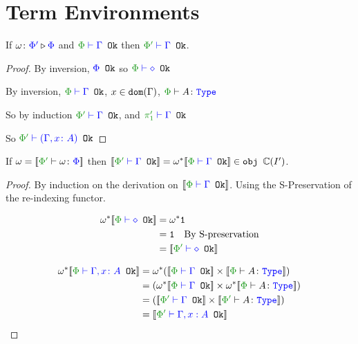 \documentclass{report}
\begin{document}
\section{Term Environments}
 
\begin{theorem}
If $\omega \colon {\color{blue}\Phi'} \triangleright {\color {blue} \Phi}$ and $\wellformedok{\P}{\G}$  then $\wellformedok{\P'}{\G}$.
\end{theorem}

\begin{framed}
     \begin{proof}
            \case{\envnil}
            By inversion,  ${\color{blue} \Phi} \texttt{ Ok}$ so $\wellformedok{\P}{\nil}$
            \case{\envextend}
        
            By inversion,  $\wellformedok{\P}{\G}$, $x\in\texttt{dom}(\Gamma)$, $\wellformedt{\P}{A}$
        
            So by induction $\wellformedok{\P'}{\G}$, and $\wellformedok{\p'}{\G}$
        
            So $\wellformedok{\P'}{(\gax)}$
     \end{proof}
        
    
\end{framed}
\begin{theorem}
      
    If $\w = \deno{\typerelation{\P'}{\w}{\P}}$ then $\deno{\wellformedok{\P'}{\G}} = \w\star\deno{\wellformedok{\P}{\G}}\in\obj\C(I')$.
\end{theorem}

\begin{framed}
    \begin{proof}
        By induction on the derivation on $\deno{\wellformedok{\P}{\G}}$. Using the S-Preservation of the re-indexing functor.
        
        \case{\envnil}
        \begin{align*}
            \w\star\deno{\wellformedok{\P}{\nil}} &=\w\star\1\\
            & = \1\qt{By S-preservation}\\
            &= \deno{\wellformedok{\P'}{\nil}}\\
        \end{align*}
        
        \case{\envextend}
        \begin{align*}
           \w\star\deno{\wellformedok{\P}{\gax}} &= \w\star(\deno{\wellformedok{\P}{\G}} \times \deno{\typerelation{\P}{A}{\type}}) \\
           & = (\w\star\deno{\wellformedok{\P}{\G}} \times \w\star\deno{\typerelation{\P}{A}{\type}})\\
            & = (\deno{\wellformedok{\P'}{\G}} \times \deno{\typerelation{\P'}{A}{\type}})\\
            & = \deno{\wellformedok{\P'}{\G, x: A}}\\
        \end{align*}
        
    \end{proof}
\end{framed}
\end{document}
